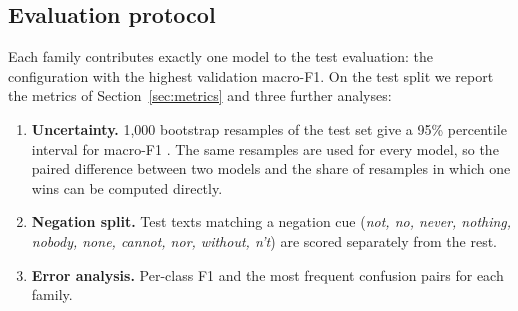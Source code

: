 \subsection{Evaluation protocol}
Each family contributes exactly one model to the test evaluation: the configuration with the highest validation macro-F1. On the test split we report the metrics of Section~\ref{sec:metrics} and three further analyses:
\begin{enumerate}
  \item \textbf{Uncertainty.} 1{,}000 bootstrap resamples of the test set give a 95\% percentile interval for macro-F1 \cite{efron1993}. The same resamples are used for every model, so the paired difference between two models and the share of resamples in which one wins can be computed directly.
  \item \textbf{Negation split.} Test texts matching a negation cue (\textit{not, no, never, nothing, nobody, none, cannot, nor, without, n't}) are scored separately from the rest.
  \item \textbf{Error analysis.} Per-class F1 and the most frequent confusion pairs for each family.
\end{enumerate}
